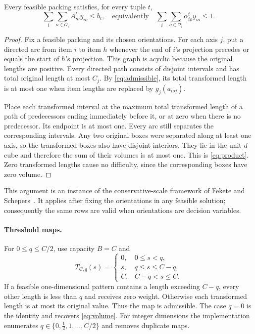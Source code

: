 \begin{proposition}
Every feasible packing satisfies, for every tuple $t$,
\begin{equation}
 \sum_i\sum_{o\in\mathcal O_i} A^t_{io}y_{io}\leq b_t,
 \quad\text{equivalently}\quad
 \sum_i\sum_{o\in\mathcal O_i}\alpha^t_{io}y_{io}\leq1.
                                                               \label{eq:product}
\end{equation}
\end{proposition}
\begin{proof}
Fix a feasible packing and its chosen orientations. For each axis $j$,
put a directed arc from item $i$ to item $h$ whenever the end of $i$'s
projection precedes or equals the start of $h$'s projection. This graph
is acyclic because the original lengths are positive. Every directed
path consists of disjoint intervals and has total original length at
most $C_j$. By \eqref{eq:admissible}, its total transformed length is at
most one when item lengths are replaced by $g_j(a_{ioj})$.

Place each transformed interval at the maximum total transformed length
of a path of predecessors ending immediately before it, or at zero
when there is no predecessor. Its endpoint is at most one. Every arc
still separates the corresponding intervals. Any two original boxes
were separated along at least one axis, so the transformed boxes also
have disjoint interiors. They lie in the unit $d$-cube and therefore
the sum of their volumes is at most one. This is \eqref{eq:product}.
Zero transformed lengths cause no difficulty, since the corresponding
boxes have zero volume.
\end{proof}
This argument is an instance of the conservative-scale framework of
Fekete and Schepers~\cite{FeketeSchepers2004}. It applies after fixing
the orientations in any feasible solution; consequently the same rows
are valid when orientations are decision variables.

\paragraph{Threshold maps.}
For $0\leq q\leq C/2$, use capacity $B=C$ and
\begin{equation}
 T_{C,q}(s)=
 \begin{cases}
 0,&0\leq s<q,\\
 s,&q\leq s\leq C-q,\\
 C,&C-q<s\leq C.
 \end{cases}                                                   \label{eq:threshold}
\end{equation}
If a feasible one-dimensional pattern contains a length exceeding
$C-q$, every other length is less than $q$ and receives zero weight.
Otherwise each transformed length is at most its original value.
Thus the map is admissible. The case $q=0$ is the identity and recovers
\eqref{eq:volume}. For integer dimensions the implementation enumerates
$q\in\{0,\tfrac12,1,\ldots,C/2\}$ and removes duplicate maps.

